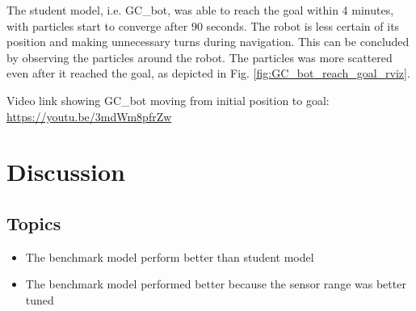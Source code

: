\documentclass[10pt,journal,compsoc]{IEEEtran}
\begin{document}
The student model, i.e. GC\_bot, was able to reach the goal within 4 minutes, with particles start to converge after 90 seconds.  The robot is less certain of its position and making unnecessary turns during navigation. This can be concluded by observing the particles around the robot. The particles was more scattered even after it reached the goal, as depicted in Fig. \ref{fig:GC_bot_reach_goal_rviz}.

Video link showing GC\_bot moving from initial position to goal:
\url{https://youtu.be/3mdWm8pfrZw}



\section{Discussion}

\subsection{Topics}
\begin{itemize}
\item The benchmark model perform better than student model
\item The benchmark model performed better because the sensor range was better tuned
\end {itemize}
\end{document}
